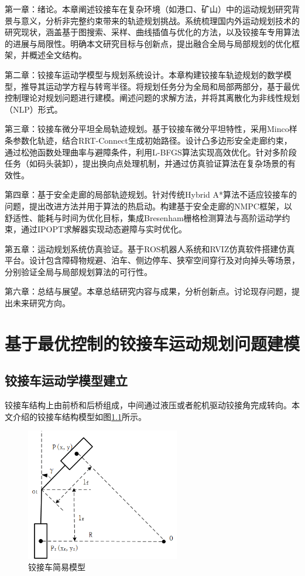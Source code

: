 \documentclass[master,academic]{ysuthesis} %
\begin{document}
	第一章：绪论。本章阐述铰接车在复杂环境（如港口、矿山）中的运动规划研究背景与意义，分析非完整约束带来的轨迹规划挑战。系统梳理国内外运动规划技术的研究现状，涵盖基于图搜索、采样、曲线插值与优化的方法，以及铰接车专用算法的进展与局限性。明确本文研究目标与创新点，提出融合全局与局部规划的优化框架，并概述全文结构。

	第二章：铰接车运动学模型与规划系统设计。本章构建铰接车轨迹规划的数学模型，推导其运动学方程与转弯半径。将规划任务分为全局和局部两部分，基于最优控制理论对规划问题进行建模。阐述问题的求解方法，并将其离散化为非线性规划（NLP）形式。

	第三章：铰接车微分平坦全局轨迹规划。基于铰接车微分平坦特性，采用Minco样条参数化轨迹，结合RRT-Connect生成初始路径。设计凸多边形安全走廊约束，通过松弛函数处理曲率与避障条件，利用L-BFGS算法实现高效优化。针对多阶段任务（如码头装卸），提出换向点处理机制，并通过仿真验证算法在复杂场景的有效性。

	第四章：基于安全走廊的局部轨迹规划。针对传统Hybrid A*算法不适应铰接车的问题，提出改进方法并用于算法的热启动。构建基于安全走廊的NMPC框架，以舒适性、能耗与时间为优化目标，集成Bresenham栅格检测算法与高阶运动学约束，通过IPOPT求解器实现动态避障与实时优化。

	第五章：运动规划系统仿真验证。基于ROS机器人系统和RVIZ仿真软件搭建仿真平台。设计包含障碍物规避、泊车、侧边停车、狭窄空间穿行及对向掉头等场景，分别验证全局与局部规划算法的可行性。

	第六章：总结与展望。本章总结研究内容与成果，分析创新点。讨论现存问题，提出未来研究方向。

	\chapter{基于最优控制的铰接车运动规划问题建模}
	\section{铰接车运动学模型建立}
	铰接车结构上由前桥和后桥组成，中间通过液压或者舵机驱动铰接角完成转向。本文介绍的铰接车结构模型如图\ref{fig:铰接车简易模型}所示。 
	\begin{figure}[H]
		\centering
		\includegraphics[width=0.6\textwidth]{铰接车简易模型.png}
		\caption{铰接车简易模型}
		\label{fig:铰接车简易模型}
	\end{figure}
\end{document}
